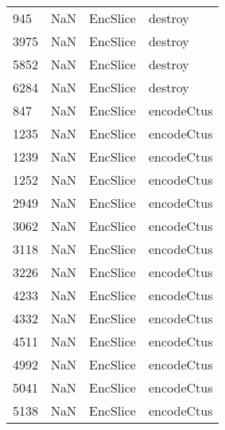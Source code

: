 \begin{tabular}{llll}
945  &                   NaN &                   EncSlice &                                   destroy \\
3975 &                   NaN &                   EncSlice &                                   destroy \\
5852 &                   NaN &                   EncSlice &                                   destroy \\
6284 &                   NaN &                   EncSlice &                                   destroy \\
847  &                   NaN &                   EncSlice &                                encodeCtus \\
1235 &                   NaN &                   EncSlice &                                encodeCtus \\
1239 &                   NaN &                   EncSlice &                                encodeCtus \\
1252 &                   NaN &                   EncSlice &                                encodeCtus \\
2949 &                   NaN &                   EncSlice &                                encodeCtus \\
3062 &                   NaN &                   EncSlice &                                encodeCtus \\
3118 &                   NaN &                   EncSlice &                                encodeCtus \\
3226 &                   NaN &                   EncSlice &                                encodeCtus \\
4233 &                   NaN &                   EncSlice &                                encodeCtus \\
4332 &                   NaN &                   EncSlice &                                encodeCtus \\
4511 &                   NaN &                   EncSlice &                                encodeCtus \\
4992 &                   NaN &                   EncSlice &                                encodeCtus \\
5041 &                   NaN &                   EncSlice &                                encodeCtus \\
5138 &                   NaN &                   EncSlice &                                encodeCtus \\

\end{tabular}
